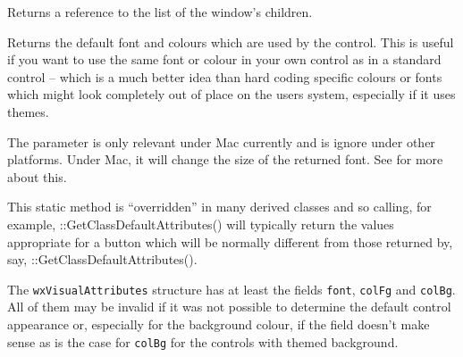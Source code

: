 \label{wxwindowgetchildren}


Returns a reference to the list of the window's children.


\label{wxwindowgetclassdefaultattributes}


Returns the default font and colours which are used by the control. This is
useful if you want to use the same font or colour in your own control as in a
standard control -- which is a much better idea than hard coding specific
colours or fonts which might look completely out of place on the users
system, especially if it uses themes.

The  parameter is only relevant under Mac currently and is
ignore under other platforms. Under Mac, it will change the size of the
returned font. See 
for more about this.

This static method is ``overridden'' in many derived classes and so calling,
for example, ::GetClassDefaultAttributes() will typically
return the values appropriate for a button which will be normally different
from those returned by, say, ::GetClassDefaultAttributes().

The \texttt{wxVisualAttributes} structure has at least the fields
\texttt{font}, \texttt{colFg} and \texttt{colBg}. All of them may be invalid
if it was not possible to determine the default control appearance or,
especially for the background colour, if the field doesn't make sense as is
the case for \texttt{colBg} for the controls with themed background.




\label{wxwindowgetclientsize}




